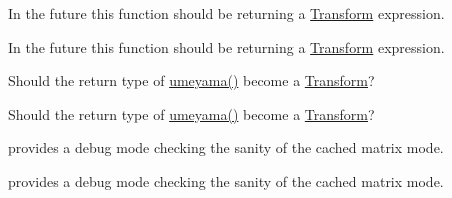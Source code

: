 
\begin{DoxyRefList}
\item[\label{todo__todo000002}%
\Hypertarget{todo__todo000002}%
Member \hyperlink{group___geometry___module_a41e2e58b09790eb8e3e220acceb7de1f}{Eigen\+:\+:Transform$<$ \+\_\+\+Scalar, \+\_\+\+Dim, \+\_\+\+Mode, \+\_\+\+Options $>$\+:\+:Identity} ()]In the future this function should be returning a \hyperlink{group___geometry___module_class_eigen_1_1_transform}{Transform} expression. 

In the future this function should be returning a \hyperlink{group___geometry___module_class_eigen_1_1_transform}{Transform} expression.  
\item[\label{todo__todo000003}%
\Hypertarget{todo__todo000003}%
Member \hyperlink{group___geometry___module_ga033d6550c1fc82e232f2b4c380c19a54}{Eigen\+:\+:umeyama} (const Matrix\+Base$<$ Derived $>$ \&src, const Matrix\+Base$<$ Other\+Derived $>$ \&dst, bool with\+\_\+scaling=true)]Should the return type of \hyperlink{group___geometry___module_ga033d6550c1fc82e232f2b4c380c19a54}{umeyama()} become a \hyperlink{group___geometry___module_class_eigen_1_1_transform}{Transform}?

Should the return type of \hyperlink{group___geometry___module_ga033d6550c1fc82e232f2b4c380c19a54}{umeyama()} become a \hyperlink{group___geometry___module_class_eigen_1_1_transform}{Transform}? 
\item[\label{todo__todo000001}%
\Hypertarget{todo__todo000001}%
Member \hyperlink{class_gpu_helper_a52a9ab12d07acbf4ad80737595a9b06e}{Gpu\+Helper\+:\+:force\+Matrix\+Target} (G\+Lenum matrix\+Target)]provides a debug mode checking the sanity of the cached matrix mode. 

provides a debug mode checking the sanity of the cached matrix mode. 
\end{DoxyRefList}